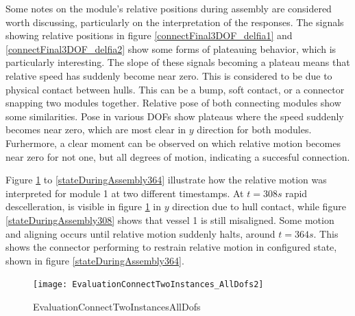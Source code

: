 Some notes on the module's relative positions during assembly are considered worth discussing, particularly on the interpretation of the responses. 
The signals showing relative positions in figure \ref{connectFinal3DOF_delfia1} and \ref{connectFinal3DOF_delfia2} show some forms of plateauing behavior, which is particularly interesting. The slope of these signals becoming a plateau means that relative speed has suddenly become near zero. This is considered to be due to physical contact between hulls. This can be a bump, soft contact, or a connector snapping two modules together. 
Relative pose of both connecting modules show some similarities. Pose in various DOFs show plateaus where the speed suddenly becomes near zero, which are most clear in $y$ direction for both modules. Furhermore, a clear moment can be observed on which relative motion becomes near zero for not one, but all degrees of motion, indicating a succesful connection. 

Figure \ref{fig:EvaluationConnectTwoInstances_AllDofs} to \ref{stateDuringAssembly364} illustrate how the relative motion was interpreted for module 1 at two different timestamps. At $t = 308s$ rapid descelleration, is visible in figure \ref{fig:EvaluationConnectTwoInstances_AllDofs} in $y$ direction due to hull contact, while figure \ref{stateDuringAssembly308} shows that vessel 1 is still misaligned. Some motion and aligning occurs until relative motion suddenly halts, around $t = 364s$. This shows the connector performing to restrain relative motion in configured state, shown in figure \ref{stateDuringAssembly364}.

\begin{figure}[H]
	\centering
	\texttt{[image: EvaluationConnectTwoInstances\_AllDofs2]}
	\caption{EvaluationConnectTwoInstancesAllDofs}
	\label{fig:EvaluationConnectTwoInstances_AllDofs}
\end{figure}

